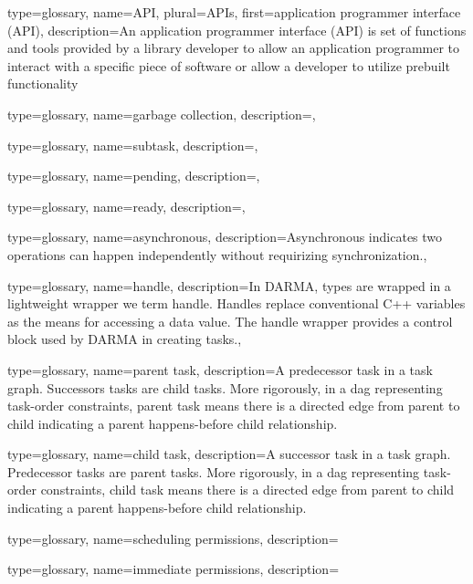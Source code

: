 {
  type=glossary,
  name={API},
  plural={APIs},
  first={application programmer interface (API)},
  description={An application programmer interface (API) is set of functions and tools provided by a library developer to allow an application programmer to interact with a specific piece of software or allow a developer to utilize prebuilt functionality}
}

{
  type=glossary,
  name={garbage collection},
  description={},
}

{
  type=glossary,
  name=subtask,
  description={},
}

{
  type=glossary,
  name=pending,
  description={},
}

{
  type=glossary,
  name=ready,
  description={},
}


{
  type=glossary,
  name={asynchronous},
  description={Asynchronous indicates two operations can happen independently without requirizing synchronization.},
}

{
  type=glossary,
  name={handle},
  description={In DARMA, types are wrapped in a lightweight wrapper we term handle.
    Handles replace conventional C++ variables as the means for accessing a data value.
    The handle wrapper provides a control block used by DARMA in creating tasks.},
}

{
  type=glossary,
  name={parent task},
  description={A predecessor task in a task graph. Successors tasks are \glspl{child task}.
    More rigorously, in a \gls{dag} representing task-order constraints,
    parent task means there is a directed edge from parent to child
    indicating a parent happens-before child relationship.}
}

{
  type=glossary,
  name={child task},
  description={A successor task in a task graph. Predecessor tasks are \glspl{parent task}.
    More rigorously, in a \gls{dag} representing task-order constraints,
    child task means there is a directed edge from parent to child
    indicating a parent happens-before child relationship.}
}

{
  type=glossary,
  name={scheduling permissions},
  description={ }
}

{
  type=glossary,
  name={immediate permissions},
  description={ }
}



